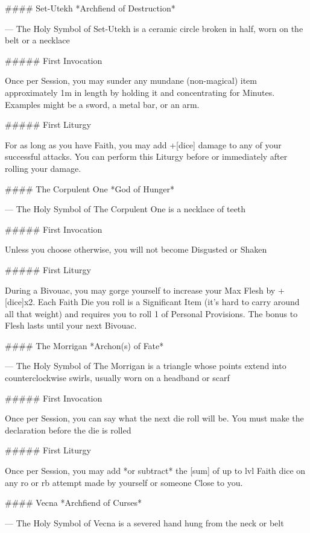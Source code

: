 #### Set-Utekh
*Archfiend of Destruction*

---
The Holy Symbol of Set-Utekh is a ceramic circle broken in half, worn on the belt or a necklace

##### First Invocation

Once per Session, you may sunder any mundane (non-magical) item approximately 1m in length by holding it and concentrating for Minutes. Examples might be a sword, a metal bar, or an arm.

##### First Liturgy

For as long as you have Faith, you may add +[dice] damage to any of your successful attacks. You can perform this Liturgy before or immediately after rolling your damage.






#### The Corpulent One
*God of Hunger*

---
The Holy Symbol of The Corpulent One is a necklace of teeth

##### First Invocation

Unless you choose otherwise, you will not become Disgusted or Shaken

##### First Liturgy

During a Bivouac, you may gorge yourself to increase your Max Flesh by +[dice]x2.  Each Faith Die you roll is a Significant Item (it's hard to carry around all that weight) and requires you to roll 1 \UD of Personal Provisions. The bonus to Flesh lasts until your next Bivouac.




#### The Morrigan
*Archon(s) of Fate*

---
The Holy Symbol of The Morrigan is a triangle whose points extend into counterclockwise swirls, usually worn on a headband or scarf

##### First Invocation

Once per Session, you can say what the next die roll will be. You must make the declaration before the die is rolled

##### First Liturgy

Once per Session, you may add *or subtract* the [sum] of up to {lvl} Faith dice on any {ro} or {rb} attempt made by yourself or someone Close to you.





#### Vecna
*Archfiend of Curses*

---
The Holy Symbol of Vecna is a severed hand hung from the neck or belt

